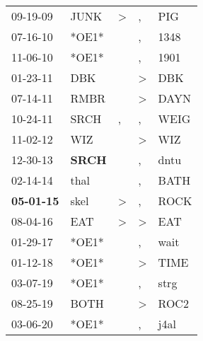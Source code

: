 \begin{supertabular}{p{0.07\textwidth}p{0.06\textwidth}p{0.02\textwidth}p{0.02\textwidth}p{0.06\textwidth}}
          09-19-09\textsuperscript{} &           JUNK\textsuperscript{} &     \textgreater &                , &            PIG\textsuperscript{} \\
          07-16-10\textsuperscript{} &                            *OE1* &                  &                , &           1348\textsuperscript{} \\
          11-06-10\textsuperscript{} &                            *OE1* &                  &                , &           1901\textsuperscript{} \\
          01-23-11\textsuperscript{} &            DBK\textsuperscript{} &                  &     \textgreater &            DBK\textsuperscript{} \\
          07-14-11\textsuperscript{} &           RMBR\textsuperscript{} &                  &     \textgreater &           DAYN\textsuperscript{} \\
          10-24-11\textsuperscript{} &           SRCH\textsuperscript{} &                , &                , &           WEIG\textsuperscript{} \\
          11-02-12\textsuperscript{} &            WIZ\textsuperscript{} &                  &     \textgreater &            WIZ\textsuperscript{} \\
          12-30-13\textsuperscript{} &  \textbf{SRCH\textsuperscript{}} &                  &                , &           dntu\textsuperscript{} \\
          02-14-14\textsuperscript{} &           thal\textsuperscript{} &                  &                , &           BATH\textsuperscript{} \\
 \textbf{05-01-15\textsuperscript{}} &           skel\textsuperscript{} &     \textgreater &                , &           ROCK\textsuperscript{} \\
          08-04-16\textsuperscript{} &            EAT\textsuperscript{} &     \textgreater &     \textgreater &            EAT\textsuperscript{} \\
          01-29-17\textsuperscript{} &                            *OE1* &                  &                , &           wait\textsuperscript{} \\
          01-12-18\textsuperscript{} &                            *OE1* &                  &     \textgreater &           TIME\textsuperscript{} \\
          03-07-19\textsuperscript{} &                            *OE1* &                  &                , &           strg\textsuperscript{} \\
          08-25-19\textsuperscript{} &           BOTH\textsuperscript{} &                  &     \textgreater &           ROC2\textsuperscript{} \\
          03-06-20\textsuperscript{} &                            *OE1* &                  &                , &           j4al\textsuperscript{} \\
\end{supertabular}
